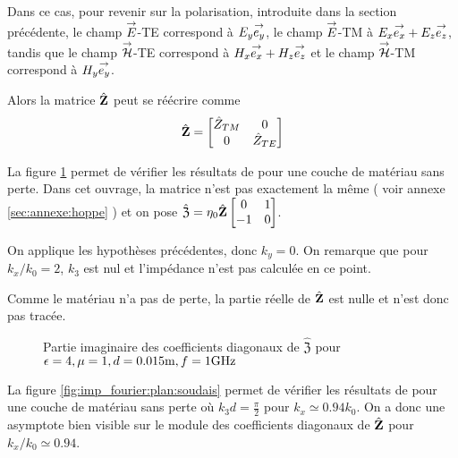         Dans ce cas, pour revenir sur la polarisation, introduite dans la section précédente, le champ \({\overset{\rightarrow}{E}}\)-TE correspond à \({E_y} {\overset{\rightarrow}{e_y}}\), le champ \({\overset{\rightarrow}{E}}\)-TM à \({E_x} {\overset{\rightarrow}{e_x}} + {E_z} {\overset{\rightarrow}{e_z}} \), tandis que le champ \({\overset{\rightarrow}{\mathcal{H}}}\)-TE correspond à \({H_x} {\overset{\rightarrow}{e_x}} + {H_z} {\overset{\rightarrow}{e_z}}\) et le champ \({\overset{\rightarrow}{\mathcal{H}}}\)-TM correspond à \({H_y} {\overset{\rightarrow}{e_y}}\).
        
        Alors la matrice \(\hat {\mathbf{Z}}\) peut se réécrire comme
        \begin{equation*}
            \hat {\mathbf{Z}} =
            \begin{bmatrix}
                \hat Z_{TM} & 0
                \\
                0 & \hat Z_{TE}
            \end{bmatrix}
        \end{equation*}


        La figure \ref{fig:imp_fourier:plan:hoppe} permet de vérifier les résultats de \cite[p.~33]{hoppe_impedance_1995} pour une couche de matériau sans perte. Dans cet ouvrage, la matrice n’est pas exactement la même ( voir annexe \ref{sec:annexe:hoppe} ) et on pose \(\hat{\mathfrak{Z}} = \eta_0\hat{\mathbf{Z}}\begin{bmatrix}0&1\\-1&0\end{bmatrix}\).

        On applique les hypothèses précédentes, donc \(k_y=0\). On remarque que pour \(k_x\slash k_0=2\), \(k_3\) est nul et l'impédance n'est pas calculée en ce point. 

        Comme le matériau n'a pas de perte, la partie réelle de \(\hat{\mathfrak{\mathbf{Z}}}\) est nulle et n'est donc pas tracée.

        \begin{figure}[!hbt]
            \centering
            
            \caption[Reproduction résultat Hoppe & Rahmat-Samii p.~33]{Partie imaginaire des coefficients diagonaux de \(\hat{\mathfrak Z}\) pour \(\epsilon = 4, \mu = 1, d=0.015\text{m}, f=1\text{GHz}\)}
            \label{fig:imp_fourier:plan:hoppe}
        \end{figure}

        La figure \ref{fig:imp_fourier:plan:soudais} permet de vérifier les résultats de \cite{soudais_3d_2017} pour une couche de matériau sans perte où \(k_3d = \frac{\pi}{2}\) pour \(k_x \simeq 0.94 k_0\). On a donc une asymptote bien visible sur le module des coefficients diagonaux de \(\hat{\mathbf{Z}}\) pour \(k_x\slash k_0 \simeq 0.94\).

